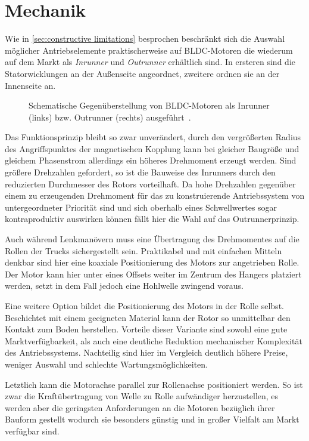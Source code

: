 \chapter{Mechanik}
	Wie in \cref{sec:constructive limitations} besprochen beschränkt sich die Auswahl möglicher Antriebselemente praktischerweise auf BLDC-Motoren die wiederum auf dem Markt als \textit{Inrunner} und \textit{Outrunner} erhältlich sind.
	In ersteren sind die Statorwicklungen an der Außenseite angeordnet, zweitere ordnen sie an der Innenseite an.
	\begin{figure}[h]
		\centering
		
		\caption[Gegenüberstellung von Inrunner und Outrunner]{Schematische Gegenüberstellung von BLDC-Motoren als Inrunner (links) bzw. Outrunner (rechts) ausgeführt~\cite{inrunner.outrunner.2022}.}
		\label{fig:inrunner outrunner}
	\end{figure}
	Das Funktionsprinzip bleibt so zwar unverändert, durch den vergrößerten Radius des Angriffspunktes der magnetischen Kopplung kann bei gleicher Baugröße und gleichem Phasenstrom allerdings ein höheres Drehmoment erzeugt werden.
	Sind größere Drehzahlen gefordert, so ist die Bauweise des Inrunners durch den reduzierten Durchmesser des Rotors vorteilhaft.
	Da hohe Drehzahlen gegenüber einem zu erzeugenden Drehmoment für das zu konstruierende Antriebssystem von untergeordneter Priorität sind und sich oberhalb eines Schwellwertes sogar kontraproduktiv auswirken können fällt hier die Wahl auf das Outrunnerprinzip.\par\medskip
	Auch während Lenkmanövern muss eine Übertragung des Drehmomentes auf die Rollen der Trucks sichergestellt sein.
	Praktikabel und mit einfachen Mitteln denkbar sind hier eine koaxiale Positionierung des Motors zur angetrieben Rolle.
	Der Motor kann hier unter eines Offsets weiter im Zentrum des Hangers platziert werden, setzt in dem Fall jedoch eine Hohlwelle zwingend voraus.\par
	Eine weitere Option bildet die Positionierung des Motors in der Rolle selbst.
	Beschichtet mit einem geeigneten Material kann der Rotor so unmittelbar den Kontakt zum Boden herstellen.
	Vorteile dieser Variante sind sowohl eine gute Marktverfügbarkeit, als auch eine deutliche Reduktion mechanischer Komplexität des Antriebssystems.
	Nachteilig sind hier im Vergleich deutlich höhere Preise, weniger Auswahl und schlechte Wartungsmöglichkeiten.\par
	Letztlich kann die Motorachse parallel zur Rollenachse positioniert werden.
	So ist zwar die Kraftübertragung von Welle zu Rolle aufwändiger herzustellen, es werden aber die geringsten Anforderungen an die Motoren bezüglich ihrer Bauform gestellt wodurch sie besonders günstig und in großer Vielfalt am Markt verfügbar sind.\par
	
